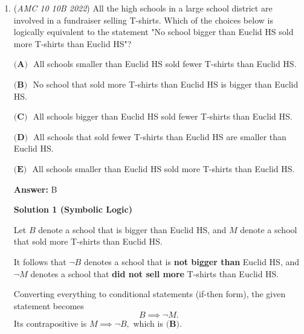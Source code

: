 \begin{enumerate}
 Now we try answer choice $\textbf{(C)}.$ The mode is $9,$ the median is $7,$ and the arithmetic mean is $5.$ From the arithmetic mean, we know that the list sums to $25.$ Three of the numbers are $\underline{\hspace{3mm}},\underline{\hspace{3mm}},7,9,9,$ which is exactly $25.$ However, our list needs positive integers, so this won't work.

 Since we were really close on answer choice $\textbf{(C)},$ we can intuitively feel that the answer is probably going to be $\textbf{(D)}.$ We can confirm this by creating a list that satisfies the problem and choose $\textbf{(D)}: 1,3,9,11,11.$

 So, our answer is $\boxed{\textbf{(D)}\ 11}.$



	\item (\textit{AMC 10 10B 2022}) All the high schools in a large school district are involved in a fundraiser selling T-shirts. Which of the choices below is logically equivalent to the statement "No school bigger than Euclid HS sold more T-shirts than Euclid HS"?


 $\textbf{(A) }$ All schools smaller than Euclid HS sold fewer T-shirts than Euclid HS.


 $\textbf{(B) }$ No school that sold more T-shirts than Euclid HS is bigger than Euclid HS.


 $\textbf{(C) }$ All schools bigger than Euclid HS sold fewer T-shirts than Euclid HS.


 $\textbf{(D) }$ All schools that sold fewer T-shirts than Euclid HS are smaller than Euclid HS.


 $\textbf{(E) }$ All schools smaller than Euclid HS sold more T-shirts than Euclid HS.


 
 \textbf{Answer: }B



\textbf{Solution 1 (Symbolic Logic)}

Let $B$ denote a school that is bigger than Euclid HS, and $M$ denote a school that sold more T-shirts than Euclid HS.

 It follows that $\neg B$ denotes a school that is \textbf{not bigger than} Euclid HS, and $\neg M$ denotes a school that \textbf{did not sell more} T-shirts than Euclid HS.

 Converting everything to conditional statements (if-then form), the given statement becomes 
 \[B\implies\neg M.\]Its contrapositive is $M\implies\neg B,$ which is $\boxed{\textbf{(B)}}.$


\end{enumerate}
